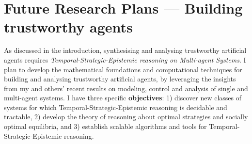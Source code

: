 \documentclass[a4paper,10pt]{scrartcl}
\def\TSE{Temporal-Strategic-Epistemic\xspace}
\begin{document}


 



\section{Future Research Plans --- Building trustworthy agents}
As discussed in the introduction, synthesising and analysing trustworthy artificial agents requires \emph{\TSE reasoning on Multi-agent Systems}.
I plan to develop the mathematical foundations and computational techniques for building and analysing 
trustworthy artificial agents, by leveraging the insights from my and others' recent results on modeling, control and analysis of single and multi-agent systems.
I have three specific \textbf{objectives}: 1) discover new classes of systems for which \TSE reasoning is decidable and tractable, 
2) develop the theory of reasoning about optimal strategies and socially optimal equilibria, and 3) establish scalable algorithms and tools for \TSE reasoning. 
\end{document}
